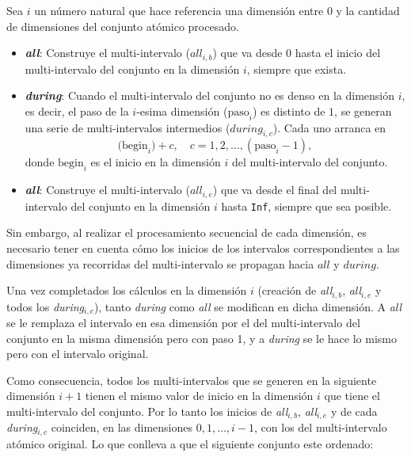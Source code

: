 Sea $i$ un número natural que hace referencia una dimensión entre $0$ y la cantidad de dimensiones del conjunto atómico procesado.
\begin{itemize}
  \item \textbf{\textit{all}}:  
    Construye el multi-intervalo ($\textit{all}_{i,b}$) que va desde $0$ hasta el inicio del multi-intervalo del conjunto en la dimensión $i$, siempre que exista.

  \item \textbf{\textit{during}}:  
    Cuando el multi-intervalo del conjunto no es denso en la dimensión $i$, es decir, el paso de la $i$-esima dimensión ($\text{paso}_i$) es distinto de $1$, se generan una serie de multi-intervalos intermedios ($\textit{during}_{i,c}$). Cada uno arranca en
    \[
      \bigl(\text{begin}_i\bigr) + c,
      \quad c = 1, 2, \dots, (\text{paso}_i - 1),
    \]
    donde $\text{begin}_i$ es el inicio en la dimensión $i$ del multi-intervalo del conjunto.

  \item \textbf{\textit{all}}:  
    Construye el multi-intervalo ($\textit{all}_{i,e}$) que va desde el final del multi-intervalo del conjunto en la dimensión $i$ hasta \texttt{Inf}, siempre que sea posible.
\end{itemize}

Sin embargo, al realizar el procesamiento secuencial de cada dimensión, es necesario tener en cuenta cómo los inicios de los intervalos correspondientes a las dimensiones ya recorridas del multi-intervalo  se propagan hacia $all$ y $during$. 

Una vez completados los cálculos en la dimensión $i$ (creación de \textit{all}$_{i,b}$, \textit{all}$_{i,e}$ y todos los \textit{during}$_{i,c}$), tanto \textit{during} como \textit{all} se modifican en dicha dimensión. A \textit{all} se le remplaza el intervalo en esa dimensión por el del multi-intervalo del conjunto en la misma dimensión pero con paso 1, y a \textit{during} se le hace lo mismo pero con el intervalo original.

Como consecuencia, todos los multi-intervalos que se generen en la siguiente dimensión $i+1$ tienen el mismo valor de inicio en la dimensión $i$ que tiene el multi-intervalo del conjunto. Por lo tanto los inicios de \textit{all}$_{i,b}$, \textit{all}$_{i,e}$ y de cada \textit{during}$_{i,c}$ coinciden, en las dimensiones $0,1,\ldots,i-1$, con los del multi-intervalo atómico original. Lo que conlleva a que el siguiente conjunto este ordenado:

